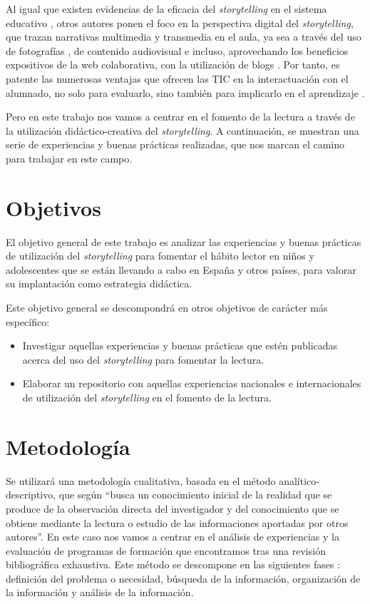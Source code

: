 \documentclass[spanish]{textolivre}
\begin{document}
Al igual que existen evidencias de la eficacia del \textit{storytelling} en el sistema educativo \cite{bautista-garcia-vera_audiovisual_2009}, otros autores \cite{robin_digital_2008,lambert_digital_2013} ponen el foco en la perspectiva digital del \textit{storytelling}, que trazan narrativas multimedia y transmedia en el aula, ya sea a través del uso de fotografías \cite{sadik_digital_2008}, de contenido audiovisual \cite{ohler_world_2006} e incluso, aprovechando los beneficios expositivos de la web colaborativa, con la utilización de blogs \cite{abdel-hack_using_2014}. Por tanto, es patente las numerosas ventajas que ofrecen las TIC en la interactuación con el alumnado, no solo para evaluarlo, sino también para implicarlo en el aprendizaje \cite{dreon_digital_2011}.

Pero en este trabajo nos vamos a centrar en el fomento de la lectura a través de la utilización didáctico-creativa del \textit{storytelling}. A continuación, se muestran una serie de experiencias y buenas prácticas realizadas, que nos marcan el camino para trabajar en este campo.


\section{Objetivos}\label{sec-modelo}
El objetivo general de este trabajo es analizar las experiencias y buenas prácticas de utilización del \textit{storytelling} para fomentar el hábito lector en niños y adolescentes que se están llevando a cabo en España y otros países, para valorar su implantación como estrategia didáctica.

Este objetivo general se descompondrá en otros objetivos de carácter más específico:

\begin{itemize}
    \item Investigar aquellas experiencias y buenas prácticas que estén publicadas acerca del uso del \textit{storytelling} para fomentar la lectura.
    \item Elaborar un repositorio con aquellas experiencias nacionales e internacionales de utilización del \textit{storytelling} en el fomento de la lectura. 
\end{itemize}

\section{Metodología}\label{sec-organizacao}
Se utilizará una metodología cualitativa, basada en el método analítico-descriptivo, que según \textcite[p. 198]{abreu_metodo_2014} “busca un conocimiento inicial de la realidad que se produce de la observación directa del investigador y del conocimiento que se obtiene mediante la lectura o estudio de las informaciones aportadas por otros autores”. En este caso nos vamos a centrar en el análisis de experiencias y la evaluación de programas de formación que encontramos tras una revisión bibliográfica exhaustiva. Este método se descompone en las siguientes fases \cite{gomez-luna_metodologipara_2014}:  definición del problema o necesidad, búsqueda de la información, organización de la información y análisis de la información.
\end{document}
